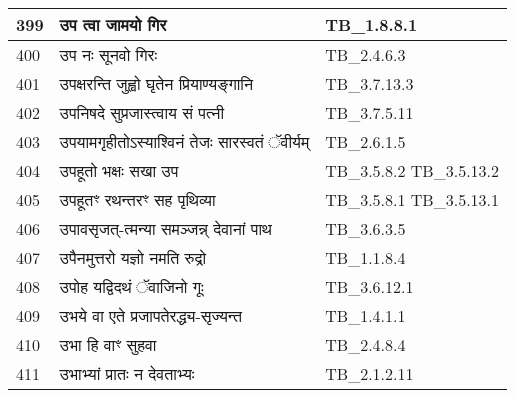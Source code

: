 \documentclass[17pt]{extarticle}
\begin{document}
\begin{longtable}{||p{0.4in}||p{4.9in}||p{0.9in}||}
    \hline
        
    399 & उप त्वा जामयो गिर & TB\_1.8.8.1       \\
    
    \hline
        
    400 & उप नः सूनवो गिरः & TB\_2.4.6.3       \\
    
    \hline
        
    401 & उपक्षरन्ति जुह्वो घृतेन प्रियाण्यङ्गानि & TB\_3.7.13.3       \\
    
    \hline
        
    402 & उपनिषदे सुप्रजास्त्वाय सं पत्नी & TB\_3.7.5.11       \\
    
    \hline
        
    403 & उपयामगृहीतोऽस्याश्विनं तेजः सारस्वतं ॅवीर्यम् & TB\_2.6.1.5       \\
    
    \hline
        
    404 & उपहूतो भक्षः सखा उप & TB\_3.5.8.2 TB\_3.5.13.2       \\
    
    \hline
        
    405 & उपहूतꣳ रथन्तरꣳ सह पृथिव्या & TB\_3.5.8.1 TB\_3.5.13.1       \\
    
    \hline
        
    406 & उपावसृजत्{-}त्मन्या समञ्जन्न् देवानां पाथ & TB\_3.6.3.5       \\
    
    \hline
        
    407 & उपैनमुत्तरो यज्ञो नमति रुद्रो & TB\_1.1.8.4       \\
    
    \hline
        
    408 & उपोह यद्विदथं ॅवाजिनो गूः & TB\_3.6.12.1       \\
    
    \hline
        
    409 & उभये वा एते प्रजापतेरद्ध्य{-}सृज्यन्त & TB\_1.4.1.1       \\
    
    \hline
        
    410 & उभा हि वाꣳ सुहवा & TB\_2.4.8.4       \\
    
    \hline
        
    411 & उभाभ्यां प्रातः न देवताभ्यः & TB\_2.1.2.11       \\
    

\end{longtable}
\end{document}

